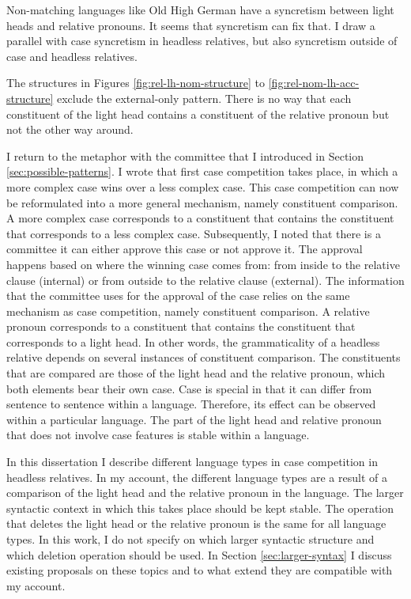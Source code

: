 Non-matching languages like Old High German have a syncretism between light heads and relative pronouns. It seems that syncretism can fix that. I draw a parallel with case syncretism in headless relatives, but also syncretism outside of case and headless relatives.

The structures in Figures \ref{fig:rel-lh-nom-structure} to \ref{fig:rel-nom-lh-acc-structure} exclude the external-only pattern. There is no way that each constituent of the light head contains a constituent of the relative pronoun but not the other way around.

I return to the metaphor with the committee that I introduced in Section \ref{sec:possible-patterns}. I wrote that first case competition takes place, in which a more complex case wins over a less complex case. This case competition can now be reformulated into a more general mechanism, namely constituent comparison. A more complex case corresponds to a constituent that contains the constituent that corresponds to a less complex case.
Subsequently, I noted that there is a committee it can either approve this case or not approve it. The approval happens based on where the winning case comes from: from inside to the relative clause (internal) or from outside to the relative clause (external). The information that the committee uses for the approval of the case relies on the same mechanism as case competition, namely constituent comparison. A relative pronoun corresponds to a constituent that contains the constituent that corresponds to a light head.
In other words, the grammaticality of a headless relative depends on several instances of constituent comparison. The constituents that are compared are those of the light head and the relative pronoun, which both elements bear their own case. Case is special in that it can differ from sentence to sentence within a language. Therefore, its effect can be observed within a particular language. The part of the light head and relative pronoun that does not involve case features is stable within a language.

In this dissertation I describe different language types in case competition in headless relatives. In my account, the different language types are a result of a comparison of the light head and the relative pronoun in the language.
The larger syntactic context in which this takes place should be kept stable. The operation that deletes the light head or the relative pronoun is the same for all language types. In this work, I do not specify on which larger syntactic structure and which deletion operation should be used. In Section \ref{sec:larger-syntax} I discuss existing proposals on these topics and to what extend they are compatible with my account.

